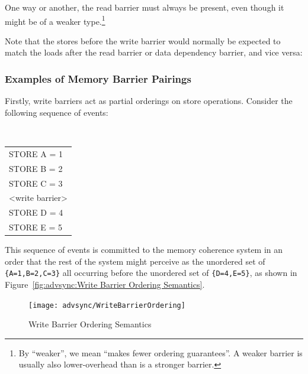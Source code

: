 One way or another, the read barrier must always be present, even though
it might be of a weaker type.\footnote{
	By ``weaker'', we mean ``makes fewer ordering guarantees''.
	A weaker barrier is usually also lower-overhead than is a
	stronger barrier.}

Note that the stores before the write barrier would normally be expected to
match the loads after the read barrier or data dependency barrier, and vice
versa:

\begin{center}
\end{center}

\subsubsection{Examples of Memory Barrier Pairings}
\label{sec:advsync:Examples of Memory Barrier Pairings}

Firstly, write barriers act as partial orderings on store operations.
Consider the following sequence of events:

\vspace{5pt}
\begin{minipage}[t]{\columnwidth}
\tt
\scriptsize
\begin{tabular}{l}
	STORE A = 1 \\
	STORE B = 2 \\
	STORE C = 3 \\
	<write barrier> \\
	STORE D = 4 \\
	STORE E = 5 \\
\end{tabular}
\end{minipage}
\vspace{5pt}

This sequence of events is committed to the memory coherence system in an order
that the rest of the system might perceive as the unordered set of
{\tt \{A=1,B=2,C=3\}}
all occurring before the unordered set of
{\tt \{D=4,E=5\}}, as shown in
Figure~\ref{fig:advsync:Write Barrier Ordering Semantics}.

\begin{figure}[htb]
\centering
\texttt{[image: advsync/WriteBarrierOrdering]}
\caption{Write Barrier Ordering Semantics}
\end{figure}

